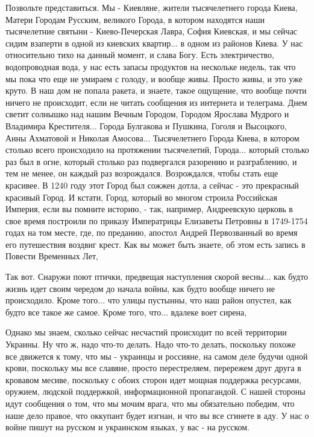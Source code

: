 Позвольте представиться. Мы - Киевляне, жители тысячелетнего города Киева,
Матери Городам Русским, великого Города, в котором находятся наши тысячелетние
святыни - Киево-Печерская Лавра, София Киевская, и мы сейчас сидим взаперти в
одной из киевских квартир... в одном из районов Киева. У нас относительно тихо
на данный момент, и слава Богу. Есть электричество, водопроводная вода, у нас
есть запасы продуктов на нескольке недель, так что мы пока что еще не умираем с
голоду, и вообще живы. Просто живы, и это уже круто. В наш дом не попала
ракета, и знаете, такое ощущение, что вообще почти ничего не происходит, если
не читать сообщения из интернета и телеграма. Днем светит солнышко над нашим
Вечным Городом, Городом Ярослава Мудрого и Владимира Крестителя... Города
Булгакова и Пушкина, Гоголя и Высоцкого, Анны Ахматовой и Николая Амосова...
Тысячелетнего Города Киева, в котором столько всего происходило на протяжении
тысячелетий, Города... который столько раз был в огне, который столько раз
подвергался разорению и разграблению, и тем не менее, он каждый раз
возрождался. Возрождался, чтобы стать еще красивее. В 1240 году этот Город был
сожжен дотла, а сейчас - это прекрасный красивый Город. И кстати, Город,
который во многом строила Российская Империя, если вы помните историю, - так,
например, Андреевскую церковь в свое время построили по приказу Императрицы
Елизаветы Петровны в 1749-1754 годах на том месте, где, по преданию, апостол
Андрей Первозванный во время его путешествия воздвиг крест. Как вы может быть
знаете, об этом есть запись в Повести Временных Лет, 

Так вот. Снаружи поют птички, предвещая наступления скорой весны... как будто
жизнь идет своим чередом до начала войны, как будто вообще ничего не
происходило. Кроме того...  что улицы пустынны, что наш район опустел, как
будто все такое же самое. Кроме того, что... вдалеке воет сирена, 

Однако мы знаем, сколько сейчас несчастий происходит по всей территории
Украины. Ну что ж, надо что-то делать. Надо что-то делать, поскольку похоже все
движется к тому, что мы - украинцы и россияне, на самом деле будучи одной
крови, поскольку мы все славяне, просто перестреляем, перережем друг друга в
кровавом месиве, поскольку с обоих сторон идет мощная поддержка ресурсами,
оружием, людской поддержкой, информационной пропагандой. С нашей стороны идут
сообщения о том, что мы мочим врага, что мы обязательно победим, что наше дело
правое, что оккупант будет изгнан, и что вы все сгинете в аду. У нас о войне
пишут на русском и украинском языках, у вас - на русском. 

